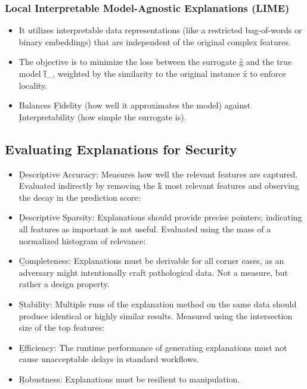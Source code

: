 \subsubsection{Local Interpretable Model-Agnostic Explanations (LIME)}

\begin{itemize}
\item It utilizes interpretable data representations (like a restricted bag-of-words or binary embeddings) that are independent of the original complex features.
\item The objective is to minimize the loss between the surrogate \f{g} and the true model \f{f_\theta}, weighted by the similarity to the original instance \f{x} to enforce locality.
\item Balances \b{Fidelity} (how well it approximates the model) against \b{Interpretability} (how simple the surrogate is).
\end{itemize}



\subsection{Evaluating Explanations for Security}

\begin{itemize}
\item \b{Descriptive Accuracy}: Measures how well the relevant features are captured. Evaluated indirectly by removing the \f{k} most relevant features and observing the decay in the prediction score: 
\item \b{Descriptive Sparsity}: Explanations should provide precise pointers; indicating all features as important is not useful. Evaluated using the mass of a normalized histogram of relevance: 
\item \b{Completeness}: Explanations must be derivable for all corner cases, as an adversary might intentionally craft pathological data. Not a measure, but rather a design property.
\item \b{Stability}: Multiple runs of the explanation method on the same data should produce identical or highly similar results. Measured using the intersection size of the top features: 
\item \b{Efficiency}: The runtime performance of generating explanations must not cause unacceptable delays in standard workflows.
\item \b{Robustness}: Explanations must be resilient to manipulation.
\end{itemize}









